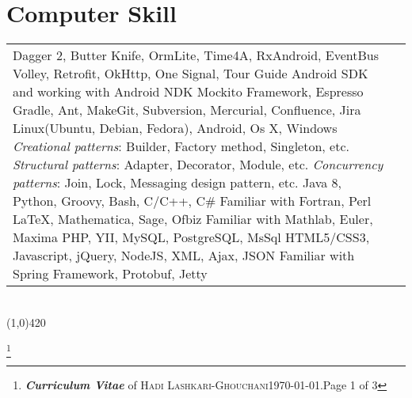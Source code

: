\documentclass[10pt]{article}
\newcommand{\maxpages}{3}
\newcommand{\maxpages}{3}
\newcommand\HRule{\hspace*{.8cm}\line(1,0){420}\\}
\newenvironment{Record}[1]
{
    \vspace{-0.35cm}
    \section*{#1}
        \vspace{0.1cm}
        \begin{tabular}
}
{
        \end{tabular}\\
        \HRule
}
\newcommand{\FootNote}[1]{\let\thefootnote\relax\footnote{\textbf{\textit{Curriculum Vitae}} of \textsc{Hadi Lashkari-Ghouchani}\qquad\today.\qquad Page #1 of \maxpages}}
\begin{document}
\begin{Record}{Computer Skill}{l l}
    \ComputerSkill{Android Library}
        {Dagger 2, Butter Knife, OrmLite, Time4A, RxAndroid, EventBus}
        {Volley, Retrofit, OkHttp, One Signal, Tour Guide}
        {Android SDK and working with Android NDK}{}{}%
    \ComputerSkill{Android Test Library}
        {Mockito Framework, Espresso}{}{}{}{}%
    \ComputerSkill{Tool}
        {Gradle, Ant, Make}{Git, Subversion, Mercurial, Confluence, Jira}{}{}{}%
    \ComputerSkill{Operating System}
        {Linux(Ubuntu, Debian, Fedora), Android, Os X, Windows}{}{}{}{}%
    \ComputerSkill{Software Design Pattern}
        {\textit{Creational patterns}: Builder, Factory method, Singleton, etc.}
        {\textit{Structural patterns}: Adapter, Decorator, Module, etc.}
        {\textit{Concurrency patterns}: Join, Lock, Messaging design pattern, etc.}{}{}%
    \ComputerSkill{Language}
        {Java 8, Python, Groovy, Bash, C/C++, C\#}
        {Familiar with Fortran, Perl}{}{}{}%
    \ComputerSkill{Special Software}
        {\LaTeX, Mathematica, Sage, Ofbiz}
        {Familiar with Mathlab, Euler, Maxima}{}{}{}%
    \ComputerSkill{Back-End Development}
        {PHP, YII, MySQL, PostgreSQL, MsSql}
        {HTML5/CSS3, Javascript, jQuery, NodeJS, XML, Ajax, JSON}
        {Familiar with Spring Framework, Protobuf, Jetty}{}{}%
\end{Record}


\FootNote{1}

\end{document}
